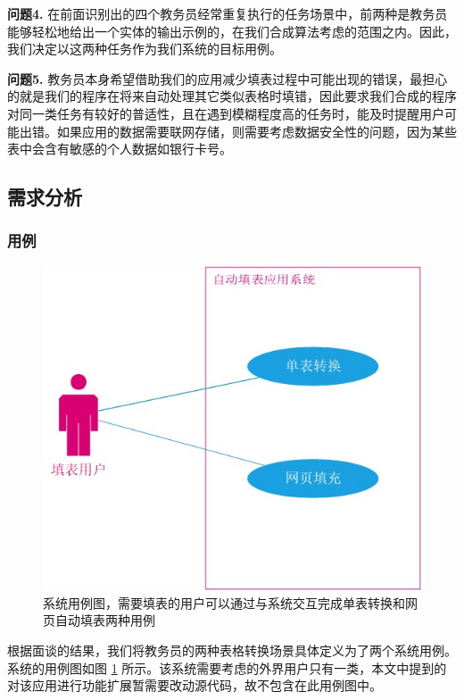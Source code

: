 \documentclass[design, pageheader]{njubachelor}
\begin{document}
{\bfseries 问题4.} 在前面识别出的四个教务员经常重复执行的任务场景中，前两种是教务员能够轻松地给出一个实体的输出示例的，在我们合成算法考虑的范围之内。因此，我们决定以这两种任务作为我们系统的目标用例。

{\bfseries 问题5.} 教务员本身希望借助我们的应用减少填表过程中可能出现的错误，最担心的就是我们的程序在将来自动处理其它类似表格时填错，因此要求我们合成的程序对同一类任务有较好的普适性，且在遇到模糊程度高的任务时，能及时提醒用户可能出错。如果应用的数据需要联网存储，则需要考虑数据安全性的问题，因为某些表中会含有敏感的个人数据如银行卡号。

\subsection{需求分析}
\subsubsection{用例}

\begin{figure}
    \includegraphics{figures/use_case.jpg}
    \caption{系统用例图，需要填表的用户可以通过与系统交互完成单表转换和网页自动填表两种用例}
    \label{fig:use_case}
\end{figure}

根据面谈的结果，我们将教务员的两种表格转换场景具体定义为了两个系统用例。系统的用例图如图 \ref{fig:use_case} 所示。该系统需要考虑的外界用户只有一类，本文中提到的对该应用进行功能扩展暂需要改动源代码，故不包含在此用例图中。
\end{document}
